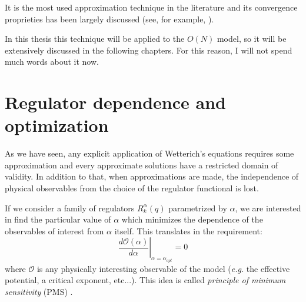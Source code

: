 It is the most used approximation technique in the literature and its convergence proprieties has been largely discussed (see, for example, \cite{verticefasi}). 

In this thesis this technique will be applied to the $O(N)$ model, so it will be extensively discussed in the following chapters.
For this reason, I will not spend much words about it now.

\section{Regulator dependence and optimization}
As we have seen, any explicit application of Wetterich's equations requires some approximation and every approximate solutions have a restricted domain of validity.  In addition to that, when approximations are made, the 
independence of physical observables from the choice of the regulator functional is lost. 

If we consider a family of regulators $R_k^{\alpha}(q)$ parametrized by $\alpha$, we are interested in find the particular value of $\alpha$
which minimizes the dependence of the observables of interest from $\alpha$ itself. This translates in the requirement:
\begin{equation}
 \left.\frac{d\mathcal{O}(\alpha)}{d\alpha}\right|_{\alpha = \alpha_{opt}} = 0
\end{equation}
where $\mathcal{O}$ is any physically interesting observable of the model (\emph{e.g.} the effective potential, a critical exponent, etc...).
This idea is called \emph{principle of minimum sensitivity} (PMS) \cite{altrolitim}.

